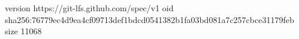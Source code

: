 version https://git-lfs.github.com/spec/v1
oid sha256:76779ec4d9ea4cf09713def1bdcd0541382b1fa03bd081a7c257cbce31179feb
size 11068
